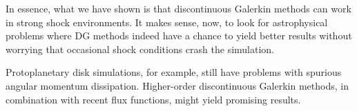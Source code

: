 
In essence, what we have shown is that discontinuous Galerkin methods can work
in strong shock environments. It makes sense, now, to look for astrophysical
problems where DG methods indeed have a chance to yield better results
without worrying that occasional shock conditions crash the simulation.

Protoplanetary disk simulations, for example, still have problems with
spurious angular momentum dissipation. Higher-order discontinuous
Galerkin methods, in combination with recent flux functions, might yield
promising results.


\newpage
